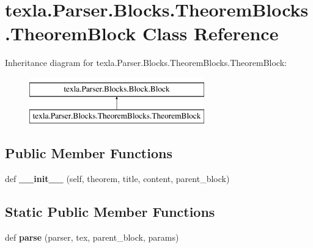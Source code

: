 \hypertarget{classtexla_1_1Parser_1_1Blocks_1_1TheoremBlocks_1_1TheoremBlock}{}\section{texla.\+Parser.\+Blocks.\+Theorem\+Blocks.\+Theorem\+Block Class Reference}
\label{classtexla_1_1Parser_1_1Blocks_1_1TheoremBlocks_1_1TheoremBlock}
Inheritance diagram for texla.\+Parser.\+Blocks.\+Theorem\+Blocks.\+Theorem\+Block\+:\begin{figure}[H]
\begin{center}
\leavevmode
\includegraphics[height=2.000000cm]{classtexla_1_1Parser_1_1Blocks_1_1TheoremBlocks_1_1TheoremBlock}
\end{center}
\end{figure}
\subsection*{Public Member Functions}
\begin{DoxyCompactItemize}
\item 
\hypertarget{classtexla_1_1Parser_1_1Blocks_1_1TheoremBlocks_1_1TheoremBlock_a90f4759fea5d972d2b10940bf23c930a}{}\label{classtexla_1_1Parser_1_1Blocks_1_1TheoremBlocks_1_1TheoremBlock_a90f4759fea5d972d2b10940bf23c930a} 
def {\bfseries \+\_\+\+\_\+init\+\_\+\+\_\+} (self, theorem, title, content, parent\+\_\+block)
\end{DoxyCompactItemize}
\subsection*{Static Public Member Functions}
\begin{DoxyCompactItemize}
\item 
\hypertarget{classtexla_1_1Parser_1_1Blocks_1_1TheoremBlocks_1_1TheoremBlock_ac08408210195d57c98e8c8d5712f08ad}{}\label{classtexla_1_1Parser_1_1Blocks_1_1TheoremBlocks_1_1TheoremBlock_ac08408210195d57c98e8c8d5712f08ad} 
def {\bfseries parse} (parser, tex, parent\+\_\+block, params)
\end{DoxyCompactItemize}

